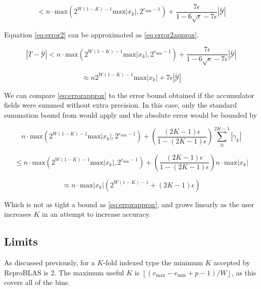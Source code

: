 \documentclass[12pt]{article}
\providecommand{\floor}[1]{\left \lfloor #1 \right \rfloor }
\providecommand{\min}{\ensuremath{\text{min}}}
\providecommand{\max}{\ensuremath{\text{max}}}
\theoremstyle{definition}
\numberwithin{equation}{section}
\numberwithin{figure}{section}
\begin{document}
    \begin{equation}
      < n \cdot \max(2^{W  (1 - K) - 1}  \max|x_k|, 2^{e_{\min} - 1}) + \frac{7\epsilon}{1 - 6 \sqrt \epsilon - 7\epsilon}|\overline{\mathcal{Y}}|
      \label{eq:error2}
    \end{equation}

    Equation \eqref{eq:error2} can be approximated as  \eqref{eq:error2approx}.

    \begin{equation*}
      |T - \overline{\mathcal{Y}}| < n \cdot \max(2^{W  (1 - K) - 1}  \max|x_k|, 2^{e_{\min} - 1}) + \frac{7\epsilon}{1 - 6 \sqrt \epsilon - 7\epsilon}  |\overline{\mathcal{Y}}|
    \end{equation*}

    \begin{equation}
      \approx n  2^{W  (1 - K) - 1} \max|x_k|+ 7  \epsilon  |\overline{\mathcal{Y}}|
      \label{eq:error2approx}
    \end{equation}

    We can compare  \eqref{eq:errorapprox} to the error bound obtained if the accumulator fields were summed without extra precision. In this case, only the standard summation bound from \cite{higham} would apply and the absolute error would be bounded by

    \begin{equation*}
    n \cdot \max(2^{W  (1 - K) - 1}  \max|x_k|, 2^{e_{\min} - 1}) + (\frac{(2  K - 1)  \epsilon}{1 - (2  K - 1)  \epsilon})  \sum\limits_0^{2  K - 1}|\gamma_k|
    \end{equation*}

    \begin{equation*}
    \leq n \cdot \max(2^{W  (1 - K) - 1}  \max|x_k|, 2^{e_{\min} - 1}) + (\frac{(2  K - 1)  \epsilon}{1 - (2  K - 1)  \epsilon})  n \cdot \max|x_k|
    \end{equation*}

    \begin{equation}
    \approx n \cdot \max|x_k| (2^{W  (1 - K) - 1} + (2  K - 1)  \epsilon)
    \label{eq:baderrorapprox}
    \end{equation}

    Which is not as tight a bound as \eqref{eq:errorapprox}, and grows linearly as the user increases $K$ in an attempt to increase accuracy.

  \subsection{Limits}
    \label{sec:primitiveops_limits}
    As discussed previously, for a $K$-fold indexed type the minimum $K$ accepted by ReproBLAS is 2. The maximum useful $K$ is $\floor{(e_{\max} - e_{\min} + p - 1)/W}$, as this covers all of the bins.
\end{document}
